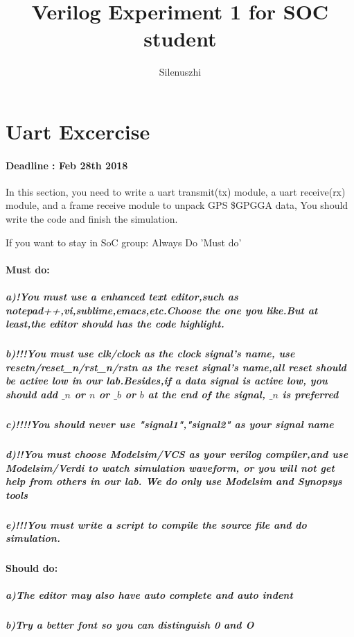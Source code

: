 \documentclass{article}
\author{Silenuszhi}
\title{Verilog Experiment 1 for SOC student}
\begin{document}
\maketitle
\newpage{}
\section{Uart Excercise}
\paragraph{Deadline : Feb 28th 2018\\}
In this section, you need to write a uart transmit(tx) module, a uart receive(rx) module, and a frame receive module to unpack GPS \$GPGGA data, You should write the code and finish the simulation.

If you want to stay in SoC group: Always Do 'Must do'
\paragraph{Must do:}
\subparagraph {a)!You must use a enhanced text editor,such as notepad++,vi,sublime,emacs,etc.Choose the one you like.But at least,the editor should has the code highlight.}
\subparagraph {b)!!!You must use clk/clock as the clock signal's name, use resetn/reset\_n/rst\_n/rstn as the reset signal's name,all reset should be active low in our lab.Besides,if a data signal is active low, you should add $\_n$ or $n$ or $\_b$ or $b$ at the end of the signal, $\_n$ is preferred}
\subparagraph {c)!!!!You should never use "signal1","signal2" as your signal name}
\subparagraph {d)!!You must choose Modelsim/VCS as your verilog compiler,and use Modelsim/Verdi to watch simulation waveform, or you will not get help from others in our lab. We do only use Modelsim and Synopsys tools}
\subparagraph {e)!!!You must write a script to compile the source file and do simulation.}
\paragraph{Should do:}
\subparagraph {a)The editor may also have auto complete and auto indent}
\subparagraph {b)Try a better font so you can distinguish 0 and O}
\end{document}
